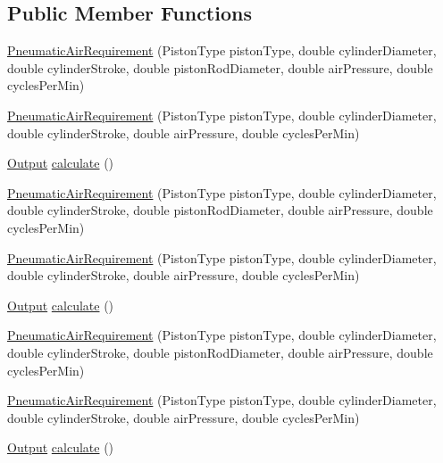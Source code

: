 \subsection*{Public Member Functions}
\begin{DoxyCompactItemize}
\item 
\hyperlink{class_pneumatic_air_requirement_a1255612b8467e69471c097c94eabcf69}{Pneumatic\+Air\+Requirement} (Piston\+Type piston\+Type, double cylinder\+Diameter, double cylinder\+Stroke, double piston\+Rod\+Diameter, double air\+Pressure, double cycles\+Per\+Min)
\item 
\hyperlink{class_pneumatic_air_requirement_a47910bc2b0f76b2c3733b0ba570a38cc}{Pneumatic\+Air\+Requirement} (Piston\+Type piston\+Type, double cylinder\+Diameter, double cylinder\+Stroke, double air\+Pressure, double cycles\+Per\+Min)
\item 
\hyperlink{class_pneumatic_air_requirement_1_1_output}{Output} \hyperlink{class_pneumatic_air_requirement_a53ea28fb64140f7bec6eedd433ac1405}{calculate} ()
\item 
\hyperlink{class_pneumatic_air_requirement_a1255612b8467e69471c097c94eabcf69}{Pneumatic\+Air\+Requirement} (Piston\+Type piston\+Type, double cylinder\+Diameter, double cylinder\+Stroke, double piston\+Rod\+Diameter, double air\+Pressure, double cycles\+Per\+Min)
\item 
\hyperlink{class_pneumatic_air_requirement_a47910bc2b0f76b2c3733b0ba570a38cc}{Pneumatic\+Air\+Requirement} (Piston\+Type piston\+Type, double cylinder\+Diameter, double cylinder\+Stroke, double air\+Pressure, double cycles\+Per\+Min)
\item 
\hyperlink{class_pneumatic_air_requirement_1_1_output}{Output} \hyperlink{class_pneumatic_air_requirement_ad49d3ecb061cc5a40aa2dc08432be04d}{calculate} ()
\item 
\hyperlink{class_pneumatic_air_requirement_a1255612b8467e69471c097c94eabcf69}{Pneumatic\+Air\+Requirement} (Piston\+Type piston\+Type, double cylinder\+Diameter, double cylinder\+Stroke, double piston\+Rod\+Diameter, double air\+Pressure, double cycles\+Per\+Min)
\item 
\hyperlink{class_pneumatic_air_requirement_a47910bc2b0f76b2c3733b0ba570a38cc}{Pneumatic\+Air\+Requirement} (Piston\+Type piston\+Type, double cylinder\+Diameter, double cylinder\+Stroke, double air\+Pressure, double cycles\+Per\+Min)
\item 
\hyperlink{class_pneumatic_air_requirement_1_1_output}{Output} \hyperlink{class_pneumatic_air_requirement_ad49d3ecb061cc5a40aa2dc08432be04d}{calculate} ()
\end{DoxyCompactItemize}


